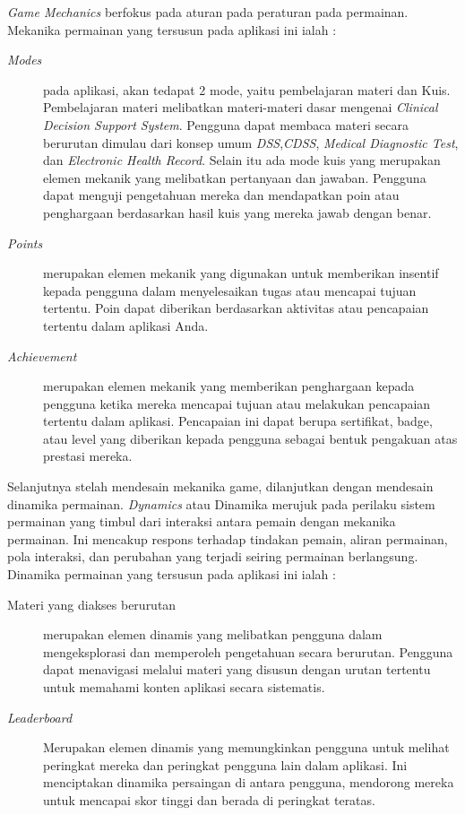 \textit{Game Mechanics} berfokus pada aturan pada peraturan pada permainan. Mekanika permainan yang tersusun pada aplikasi ini ialah :
\begin{description}
	\item[\textit{Modes}]
	pada aplikasi, akan tedapat 2 mode, yaitu pembelajaran materi dan Kuis.
	Pembelajaran materi melibatkan materi-materi dasar mengenai \textit{Clinical Decision Support System}. Pengguna dapat membaca materi secara berurutan dimulau dari konsep umum \textit{DSS},\textit{CDSS}, \textit{Medical Diagnostic Test}, dan \textit{Electronic Health Record}.
	Selain itu ada mode kuis yang
	merupakan elemen mekanik yang melibatkan pertanyaan dan jawaban. Pengguna dapat menguji pengetahuan mereka dan mendapatkan poin atau penghargaan berdasarkan hasil kuis yang mereka jawab dengan benar.
	\item[\textit{Points}] merupakan elemen mekanik yang digunakan untuk memberikan insentif kepada pengguna dalam menyelesaikan tugas atau mencapai tujuan tertentu. Poin dapat diberikan berdasarkan aktivitas atau pencapaian tertentu dalam aplikasi Anda.
	\item[\textit{Achievement}] merupakan elemen mekanik yang memberikan penghargaan kepada pengguna ketika mereka mencapai tujuan atau melakukan pencapaian tertentu dalam aplikasi. Pencapaian ini dapat berupa sertifikat, badge, atau level yang diberikan kepada pengguna sebagai bentuk pengakuan atas prestasi mereka.
\end{description}
Selanjutnya stelah mendesain mekanika game, dilanjutkan dengan mendesain dinamika permainan. \textit{Dynamics} atau Dinamika merujuk pada perilaku sistem permainan yang timbul dari interaksi antara pemain dengan mekanika permainan. Ini mencakup respons terhadap tindakan pemain, aliran permainan, pola interaksi, dan perubahan yang terjadi seiring permainan berlangsung. Dinamika permainan yang tersusun pada aplikasi ini ialah : 
\begin{description}
	\item[{Materi yang diakses berurutan}] merupakan elemen dinamis yang melibatkan pengguna dalam mengeksplorasi dan memperoleh pengetahuan secara berurutan. Pengguna dapat menavigasi melalui materi yang disusun dengan urutan tertentu untuk memahami konten aplikasi secara sistematis.
	\item[\textit{Leaderboard}] Merupakan elemen dinamis yang memungkinkan pengguna untuk melihat peringkat mereka dan peringkat pengguna lain dalam aplikasi. Ini menciptakan dinamika persaingan di antara pengguna, mendorong mereka untuk mencapai skor tinggi dan berada di peringkat teratas.
\end{description}
